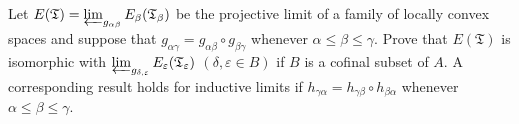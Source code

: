 Let $E(\mathfrak{T}) = \varprojlim_{g_{\alpha\beta}} E_{\beta}(\mathfrak{T}_\beta)$ be the projective limit of a family of locally convex spaces and suppose that $g_{\alpha\gamma} = g_{\alpha\beta} \circ g_{\beta\gamma}$ whenever $\alpha \leq \beta \leq \gamma$. Prove that $E(\mathfrak{T})$ is isomorphic with $\varprojlim_{g_{\delta,\varepsilon}} E_{\varepsilon}(\mathfrak{T}_\varepsilon)$ $(\delta, \varepsilon \in B)$ if $B$ is a cofinal subset of $A$. A corresponding result holds for inductive limits if $h_{\gamma\alpha} = h_{\gamma\beta} \circ h_{\beta\alpha}$ whenever $\alpha \leq \beta \leq \gamma$.
